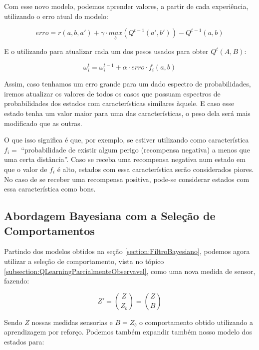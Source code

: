 Com esse novo modelo, podemos aprender valores, a partir de cada experiência, utilizando o erro atual do modelo:

\begin{equation} \label{equation:ErroQPartiallyObservable}
	erro = r \left( a, b, a' \right) + \gamma \cdot \underset{b}{max} \left( Q^{t-1} \left( a', b' \right) \right) - Q^{t-1} \left( a, b \right)
\end{equation}

E o utilizando para atualizar cada um dos pesos usados para obter $ Q^t \left( A, B \right) $:

\begin{equation} \label{equation:UpdateOmegaQPartiallyObservable}
	\omega_i^t = \omega_i^{t-1} + \alpha \cdot erro \cdot f_i \left( a, b \right)
\end{equation}

Assim, caso tenhamos um erro grande para um dado espectro de probabilidades, iremos atualizar os valores de todos os casos que possuam espectros de probabilidades dos estados com características similares àquele. E caso esse estado tenha um valor maior para uma das características, o peso dela será mais modificado que as outras.

O que isso significa é que, por exemplo, se estiver utilizando como característica $ f_i = $ ``probabilidade de existir algum perigo (recompensa negativa) a menos que uma certa distância''. Caso se receba uma recompensa negativa num estado em que o valor de $ f_i $ é alto, estados com essa característica serão considerados piores. No caso de se receber uma recompensa positiva, pode-se considerar estados com essa característica como bons.


\subsection{Abordagem Bayesiana com a Seleção de Comportamentos} \label{subsection:BayesComSelecaoDeComportamento}

Partindo dos modelos obtidos na seção \ref{section:FiltroBayesiano}, podemos agora utilizar a seleção de comportamento, vista no tópico \ref{subsection:QLearningParcialmenteObservavel}, como uma nova medida de sensor, fazendo:

\begin{equation}
	Z' = \binom{Z}{Z_b} = \binom{Z}{B}
\end{equation}

Sendo $ Z $ nossas medidas sensorias e $ B = Z_b $ o comportamento obtido utilizando a aprendizagem por reforço. Podemos também expandir também nosso modelo dos estados para:

